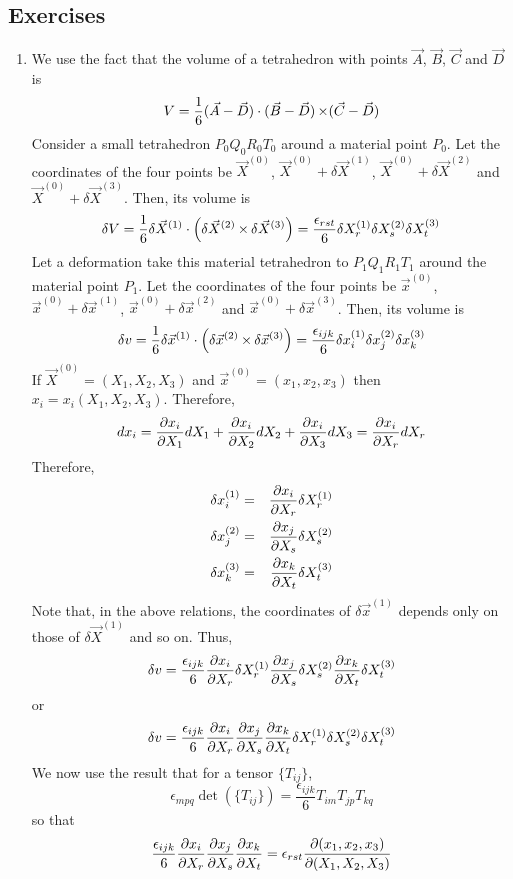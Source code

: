 \subsection{Exercises}
\begin{enumerate}
\item We use the fact that the volume of a tetrahedron with points $\vec{A}$, $\vec{B}$, $\vec{C}$ and $\vec{D}$ is
\[
V = \frac{1}{6}(\vec{A} - \vec{D})\cdot(\vec{B} - \vec{D}) \operatorname{\times} (\vec{C} - \vec{D})
\]
Consider a small tetrahedron $P_0Q_0R_0T_0$ around a material point $P_0$. Let the coordinates of the four points be $\vec{X}^{(0)}$, $\vec{X}^{(0)} + \delta\vec{X}^{(1)}$,
$\vec{X}^{(0)} + \delta\vec{X}^{(2)}$ and $\vec{X}^{(0)} + \delta\vec{X}^{(3)}$. Then, its volume is
\[
\delta V = \frac{1}{6}\delta\vec{X}^{(1)}\cdot\left(\delta\vec{X}^{(2)} \operatorname{\times} \delta\vec{X}^{(3)} \right) = \frac{\epsilon_{rst}}{6}\delta{X}_r^{(1)}\delta{X}_s^{(2)}\delta{X}_t^{(3)}
\]
Let a deformation take this material tetrahedron to $P_1Q_1R_1T_1$ around the material point $P_1$. Let the coordinates of the four points be $\vec{x}^{(0)}$, 
$\vec{x}^{(0)} + \delta\vec{x}^{(1)}$, $\vec{x}^{(0)} + \delta\vec{x}^{(2)}$ and $\vec{x}^{(0)} + \delta\vec{x}^{(3)}$. Then, its volume is
\[
\delta v = \frac{1}{6}\delta\vec{x}^{(1)}\cdot\left(\delta\vec{x}^{(2)} \operatorname{\times} \delta\vec{x}^{(3)} \right) = \frac{\epsilon_{ijk}}{6}\delta{x}_i^{(1)}\delta{x}_j^{(2)}\delta{x}_k^{(3)}
\]
If $\vec{X}^{(0)} = (X_1, X_2, X_3)$ and $\vec{x}^{(0)} = (x_1, x_2, x_3)$ then $x_i = x_i(X_1, X_2, X_3)$. Therefore,
\[
dx_i = \frac{\partial{x_i}}{\partial{X_1}}dX_1 + \frac{\partial{x_i}}{\partial{X_2}}dX_2 + \frac{\partial{x_i}}{\partial{X_3}}dX_3 = \frac{\partial{x_i}}{\partial{X_r}}dX_r
\]
Therefore,
\begin{eqnarray*}
\delta x_i^{(1)} &=& \frac{\partial{x_i}}{\partial{X_r}}\delta X_r^{(1)} \\
\delta x_j^{(2)} &=& \frac{\partial{x_j}}{\partial{X_s}}\delta X_s^{(2)} \\
\delta x_k^{(3)} &=& \frac{\partial{x_k}}{\partial{X_t}}\delta X_t^{(3)}
\end{eqnarray*}
Note that, in the above relations, the coordinates of $\delta\vec{x}^{(1)}$ depends only on those of $\delta\vec{X}^{(1)}$ and so on. Thus,
\[
\delta v = \frac{\epsilon_{ijk}}{6}\frac{\partial{x_i}}{\partial{X_r}}\delta X_r^{(1)}\frac{\partial{x_j}}{\partial{X_s}}\delta X_s^{(2)}\frac{\partial{x_k}}{\partial{X_t}}\delta X_t^{(3)}
\]
or
\[
\delta v = \frac{\epsilon_{ijk}}{6}\frac{\partial{x_i}}{\partial{X_r}}\frac{\partial{x_j}}{\partial{X_s}}\frac{\partial{x_k}}{\partial{X_t}}\delta X_r^{(1)}\delta X_s^{(2)}\delta X_t^{(3)}
\]
We now use the result that for a tensor $\{T_{ij}\}$,
\[
\epsilon_{mpq}\det(\{T_{ij}\}) = \frac{\epsilon_{ijk}}{6}T_{im}T_{jp}T_{kq}
\]
so that
\[
\frac{\epsilon_{ijk}}{6}\frac{\partial{x_i}}{\partial{X_r}}\frac{\partial{x_j}}{\partial{X_s}}\frac{\partial{x_k}}{\partial{X_t}} = \epsilon_{rst}\frac{\partial(x_1, x_2, x_3)}{\partial(X_1, X_2, X_3)}
\]
\end{enumerate}
